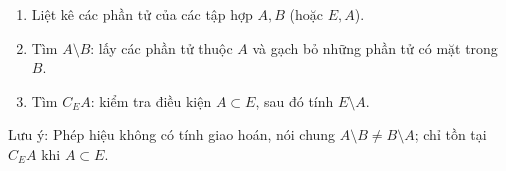 \begin{enumerate}
\item Liệt kê các phần tử của các tập hợp $A, B$ (hoặc $E, A$).
\item Tìm $A \setminus B$: lấy các phần tử thuộc $A$ và gạch bỏ những phần tử có mặt trong $B$.
\item Tìm $C_E A$: kiểm tra điều kiện $A \subset E$, sau đó tính $E \setminus A$.
\end{enumerate}
Lưu ý: Phép hiệu không có tính giao hoán, nói chung $A \setminus B \neq B \setminus A$; chỉ tồn tại $C_E A$ khi $A \subset E$.
